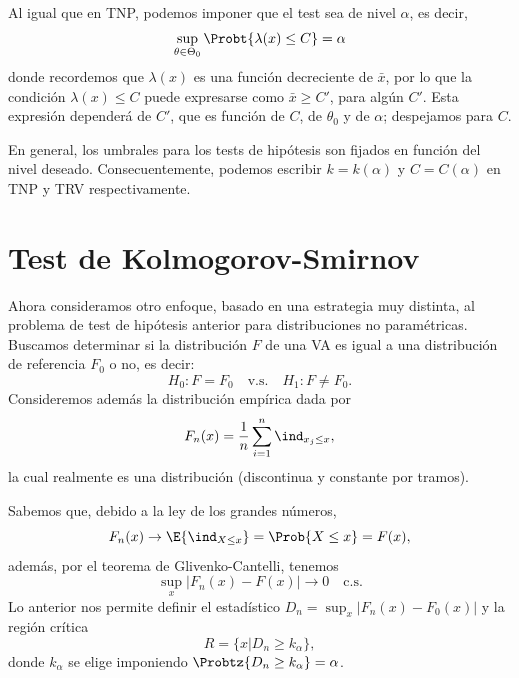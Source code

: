 \begin{example}
Al igual que en TNP, podemos imponer que el test sea de nivel $\alpha$, es decir, 
\begin{equation}
 	\sup_{\theta\in\Theta_0} \Probt{\lambda(x)\leq C} = \alpha
 \end{equation} 
 donde recordemos que $\lambda(x)$ es una función decreciente de $\bar{x}$, por lo que la condición $\lambda(x)\leq C$ puede expresarse como $\bar{x}\geq C'$, para algún $C'$. Esta expresión dependerá de $C'$, que es función de $C$, de $\theta_0$ y de $\alpha$; despejamos para $C$.
 
 \end{example} 
 
 \begin{remark}
     En general, los umbrales para los tests de hipótesis son fijados en función del nivel deseado. Consecuentemente, podemos escribir $k=k(\alpha)$ y $C=C(\alpha)$ en TNP y TRV respectivamente. 
 \end{remark}



 \section{Test de Kolmogorov-Smirnov} 
\label{sub:test_KS}

Ahora consideramos otro enfoque, basado en una estrategia muy distinta, al problema de test de hipótesis anterior para distribuciones no paramétricas. Buscamos determinar si la distribución $F$ de una VA es igual a una distribución de referencia $F_0$ o no, es decir: 
	\begin{equation}
		H_0:F=F_0\quad \text{v.s.}\quad H_1:F\neq F_0.
	\end{equation}
Consideremos además la distribución empírica dada por 
\begin{equation}
	F_n(x) = \frac{1}{n}\sum_{i=1}^n\ind_{x_j\leq x}, 
\end{equation}
la cual realmente es una distribución (discontinua y  constante por tramos). 

Sabemos que, debido a la ley de los grandes números, 
\begin{equation}
	F_n(x)\to \E{\ind_{X\leq x}} = \Prob{X\leq x} =  F(x),
\end{equation}
además, por el teorema de Glivenko-Cantelli, tenemos 
\begin{equation}
	\sup_x|F_n(x)-F(x)| \to 0 \quad\text{c.s.}
\end{equation}
Lo anterior nos permite definir el estadístico  $D_n = \sup_x|F_n(x)-F_0(x)|$ y la región crítica
\begin{equation}
	R = \{x|D_n\geq k_\alpha\},
\end{equation}
donde $k_\alpha$ se elige imponiendo $\Probtz{D_n\geq  k_\alpha}=\alpha$.

